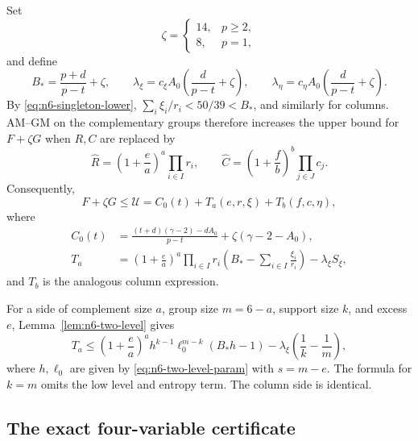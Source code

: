 \documentclass[11pt]{article}
\theoremstyle{definition}
\newcommand{\1}{\mathbf{1}}
\begin{document}
Set
\begin{equation}\label{eq:n6-zeta}
 \zeta=\begin{cases}14,&p\ge2,\\8,&p=1,\end{cases}
\end{equation}
and define
\begin{equation}\label{eq:n6-Bstar}
 B_*=\frac{p+d}{p-t}+\zeta,
 \qquad
 \lambda_\xi=c_\xi A_0\left(\frac d{p-t}+\zeta\right),
 \qquad
 \lambda_\eta=c_\eta A_0\left(\frac d{p-t}+\zeta\right).
\end{equation}
By \eqref{eq:n6-singleton-lower},
$\sum_i\xi_i/r_i<50/39<B_*$, and similarly for columns.  AM--GM on the
complementary groups therefore increases the upper bound for $F+\zeta G$
when $R,C$ are replaced by
\[
 \widehat R=\left(1+\frac ea\right)^a\prod_{i\in I}r_i,
 \qquad
 \widehat C=\left(1+\frac fb\right)^b\prod_{j\in J}c_j.
\]
Consequently,
\begin{equation}\label{eq:n6-dual-upper}
 F+\zeta G\le\mathcal U
 =C_0(t)+T_a(e,r,\xi)+T_b(f,c,\eta),
\end{equation}
where
\begin{align}
 C_0(t)&=
 \frac{(t+d)(\gamma-2)-dA_0}{p-t}
 +\zeta(\gamma-2-A_0),\label{eq:n6-C0}\\
 T_a&=
 \left(1+\frac ea\right)^a\prod_{i\in I}r_i
 \left(B_*-\sum_{i\in I}\frac{\xi_i}{r_i}\right)
 -\lambda_\xi S_\xi,\label{eq:n6-Ta}
\end{align}
and $T_b$ is the analogous column expression.

For a side of complement size $a$, group size $m=6-a$, support size $k$,
and excess $e$, Lemma~\ref{lem:n6-two-level} gives
\begin{equation}\label{eq:n6-Tcandidate}
 T_a\le
 \left(1+\frac ea\right)^a
 h^{k-1}\ell_0^{m-k}(B_*h-1)
 -\lambda_\xi\left(\frac1k-\frac1m\right),
\end{equation}
where $h,\ell_0$ are given by \eqref{eq:n6-two-level-param} with
$s=m-e$.  The formula for $k=m$ omits the low level and entropy term.  The
column side is identical.

\subsection{The exact four-variable certificate}
\end{document}
